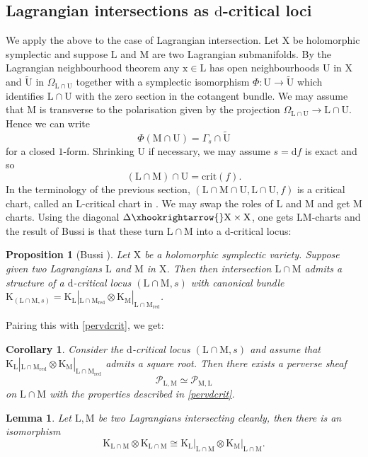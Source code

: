 \documentclass{article}
\theoremstyle{plain}
\newtheorem{corollary}[theorem]{Corollary}
\newtheorem{lemma}[theorem]{Lemma}
\newtheorem{proposition}[theorem]{Proposition}
\theoremstyle{definition}
\theoremstyle{remark}
\newcommand{\mr}{\mathrm}
\newcommand{\3}{\vspace{3mm}}
\newcommand{\2}{\vspace{2mm}}
\newcommand{\1}{\vspace{1mm}}
\begin{document}
\subsection{Lagrangian intersections as \texorpdfstring{$\mr{d}$}--critical loci}\label{localmodel}
We apply the above to the case of Lagrangian intersection. Let $\mr{X}$ be holomorphic symplectic and suppose $\mr{L}$ and $\mr{M}$ are two Lagrangian submanifolds. By the Lagrangian neighbourhood theorem any $\mr{x} \in \mr{L}$ has open neighbourhoods $\mr{U}$ in $\mr{X}$ and $\tilde{\mr{U}}$ in $\Omega_{\mr{L\cap U}}$ together with a symplectic isomorphism $\Phi:\mr{U}\to \tilde{\mr{U}}$ which identifies $\mr{L}\cap\mr{U}$ with the zero section in the cotangent bundle. We may assume that $\mr{M}$ is transverse to the polarisation given by the projection $\Omega_{\mr{L\cap U}}\to \mr{L\cap U}$. Hence we can write $$\Phi(\mr{M}\cap \mr{U})=\Gamma_s\cap \tilde{\mr{U}}$$ for a closed $1$-form. Shrinking $\mr{U}$ if necessary, we may assume $s=\mr{d}f$ is exact and so $$(\mr{L\cap M})\cap \mr{U}=\mr{crit}(f).$$ In the terminology of the previous section, $(\mr{L\cap M \cap U},\mr{L}\cap \mr{U},f)$ is a critical chart, called an $\mr{L}$-critical chart in \cite{Bussi:2014psa}. We may swap the roles of $\mr{L}$ and $\mr{M}$ and get $\mr{M}$ charts. Using the diagonal $\Delta \xhookrightarrow{} \mr{X}\times\mr{X}$, one gets $\mr{LM}$-charts and the result of Bussi is that these turn $\mr{L\cap M}$ into a $\mr{d}$-critical locus:
\2 
\begin{proposition}[Bussi \cite{Bussi:2014psa}]
 Let $\mr{X}$ be a holomorphic symplectic variety. Suppose given two Lagrangians $\mr{L}$ and $\mr{M}$ in $\mr{X}$. Then then intersection $\mr{L}\cap \mr{M}$ admits a structure of a $\mr{d}$-critical locus $(\mr{L}\cap \mr{M},s)$ with canonical bundle $\mr{K}_{(\mr{L}\cap\mr{M},s)}=\mr{K}_\mr{L}|_\mr{\mr{L}\cap\mr{M}_{red}}\otimes\mr{K}_\mr{M}|_{\mr{\mr{L}\cap\mr{M}_{red}}}$.
\end{proposition}
Pairing this with \cref{pervdcrit}, we get:
\2
\begin{corollary}
 Consider the $\mr{d}$-critical locus $(\mr{L}\cap \mr{M},s)$ and assume that $\mr{K}_\mr{L}|_\mr{\mr{L}\cap\mr{M}_{red}}\otimes\mr{K}_\mr{M}|_{\mr{\mr{L}\cap\mr{M}_{red}}}$ admits a square root. Then there exists a perverse sheaf $$\mathscr{P}_{\mr{L,M}} \simeq \mathscr{P}_{\mr{M,L}}$$ on $\mr{L}\cap \mr{M}$ with the properties described in \cref{pervdcrit}.
\end{corollary}
\2
\begin{lemma}\label{lemmasmoothcase}
  Let $\mr{L,M}$ be two Lagrangians intersecting cleanly, then there is an isomorphism $$\mr{K_{\mr{L}\cap\mr{M}}\otimes K_{\mr{L}\cap\mr{M}} \cong \left.K_{L}\right|_{\mr{L}\cap\mr{M}}\otimes \left.K_{M}\right|_{\mr{L}\cap\mr{M}}}.$$
 \end{lemma}
\end{document}
